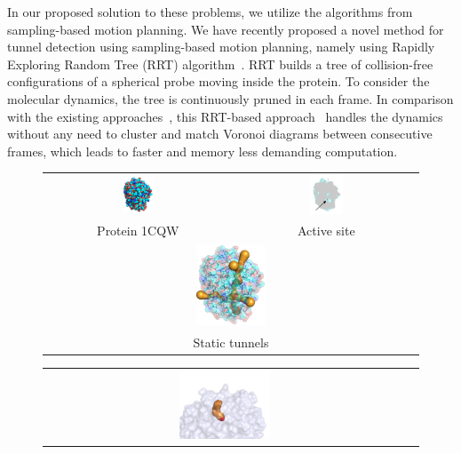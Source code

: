 \documentclass[usletter, 10pt, conference]{svjour3}      %
\begin{document}
In our proposed solution to these problems, we utilize the algorithms from sampling-based motion planning.
We have recently proposed a novel method for tunnel detection using sampling-based motion planning, namely using Rapidly Exploring Random Tree (RRT) algorithm~\cite{vonasek2017tunnel}.
RRT builds a tree of collision-free configurations of a spherical probe moving inside the protein. 
To consider the molecular dynamics, the tree is continuously pruned in each frame.
In comparison with the existing approaches~\cite{Petrek20071357,petrek2006caver}, this RRT-based approach~\cite{vonasek2016application} 
handles the dynamics without any need to cluster and match Voronoi diagrams between consecutive frames, which 
leads to faster and memory less demanding computation.


\begin{figure}[t]
\centering
{\footnotesize
\renewcommand{\arraystretch}{0.1}
\renewcommand{\tabcolsep}{0pt}
\begin{tabular}{cc}
\includegraphics[width=0.17\textwidth]{fig/motiv1} &
\includegraphics[width=0.19\textwidth]{fig/motiv2lab} \\
Protein 1CQW & Active site \\
\multicolumn{2}{c}{\includegraphics[width=0.19\textwidth]{fig/motiv3}} \\
\multicolumn{2}{c}{Static tunnels }
\end{tabular}
\begin{tabular}{cc}
\includegraphics[width=0.26\textwidth]{fig/dt-f5} &

\end{tabular}}
\end{figure}
\end{document}

